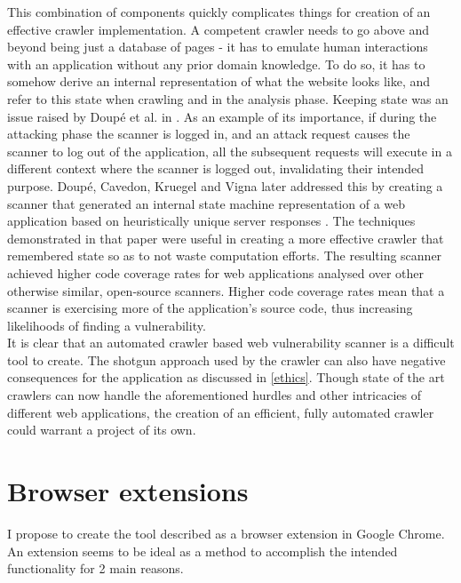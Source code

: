 This combination of components quickly complicates things for creation of an effective crawler implementation. A competent crawler needs to go above and beyond being just a database of pages - it has to emulate human interactions with an application without any prior domain knowledge. To do so, it has to somehow derive an internal representation of what the website looks like, and refer to this state when crawling and in the analysis phase. Keeping state was an issue raised by Doup\'e et al. in \cite{whyJohnnyCantPentest}. As an example of its importance, if during the attacking phase the scanner is logged in, and an attack request causes the scanner to log out of the application, all the subsequent requests will execute in a different context where the scanner is logged out, invalidating their intended purpose. Doup\'e, Cavedon, Kruegel and Vigna later addressed this by creating a scanner that generated an internal state machine representation of a web application based on heuristically unique server responses \cite{stateAwareBlackBoxWebVulnScanner}. The techniques demonstrated in that paper were useful in creating a more effective crawler that remembered state so as to not waste computation efforts. The resulting scanner achieved higher code coverage rates for web applications analysed over other otherwise similar, open-source scanners. Higher code coverage rates mean that a scanner is exercising more of the application's source code, thus increasing likelihoods of finding a vulnerability. \\

It is clear that an automated crawler based web vulnerability scanner is a difficult tool to create. The shotgun approach used by the crawler can also have negative consequences for the application as discussed in \ref{ethics}. Though state of the art crawlers can now handle the aforementioned hurdles and other intricacies of different web applications, the creation of an efficient, fully automated crawler could warrant a project of its own. \\

 
\section{Browser extensions} \label{browserExtensions}

I propose to create the tool described as a browser extension in Google Chrome. An extension seems to be ideal as a method to accomplish the intended functionality for 2 main reasons.

